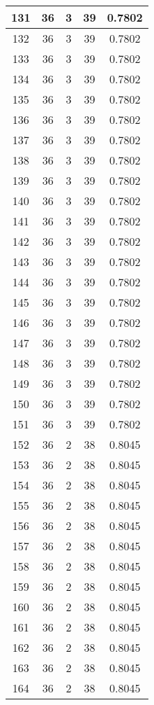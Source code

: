 \documentclass[letterpaper, 12pt]{article}
\begin{document}
\begin{longtable}{|c|c|c|c|c|}
\hline
131 & 36 & 3 & 39 & 0.7802 \\
\hline
132 & 36 & 3 & 39 & 0.7802 \\
\hline
133 & 36 & 3 & 39 & 0.7802 \\
\hline
134 & 36 & 3 & 39 & 0.7802 \\
\hline
135 & 36 & 3 & 39 & 0.7802 \\
\hline
136 & 36 & 3 & 39 & 0.7802 \\
\hline
137 & 36 & 3 & 39 & 0.7802 \\
\hline
138 & 36 & 3 & 39 & 0.7802 \\
\hline
139 & 36 & 3 & 39 & 0.7802 \\
\hline
140 & 36 & 3 & 39 & 0.7802 \\
\hline
141 & 36 & 3 & 39 & 0.7802 \\
\hline
142 & 36 & 3 & 39 & 0.7802 \\
\hline
143 & 36 & 3 & 39 & 0.7802 \\
\hline
144 & 36 & 3 & 39 & 0.7802 \\
\hline
145 & 36 & 3 & 39 & 0.7802 \\
\hline
146 & 36 & 3 & 39 & 0.7802 \\
\hline
147 & 36 & 3 & 39 & 0.7802 \\
\hline
148 & 36 & 3 & 39 & 0.7802 \\
\hline
149 & 36 & 3 & 39 & 0.7802 \\
\hline
150 & 36 & 3 & 39 & 0.7802 \\
\hline
151 & 36 & 3 & 39 & 0.7802 \\
\hline
152 & 36 & 2 & 38 & 0.8045 \\
\hline
153 & 36 & 2 & 38 & 0.8045 \\
\hline
154 & 36 & 2 & 38 & 0.8045 \\
\hline
155 & 36 & 2 & 38 & 0.8045 \\
\hline
156 & 36 & 2 & 38 & 0.8045 \\
\hline
157 & 36 & 2 & 38 & 0.8045 \\
\hline
158 & 36 & 2 & 38 & 0.8045 \\
\hline
159 & 36 & 2 & 38 & 0.8045 \\
\hline
160 & 36 & 2 & 38 & 0.8045 \\
\hline
161 & 36 & 2 & 38 & 0.8045 \\
\hline
162 & 36 & 2 & 38 & 0.8045 \\
\hline
163 & 36 & 2 & 38 & 0.8045 \\
\hline
164 & 36 & 2 & 38 & 0.8045 \\

\end{longtable}
\end{document}
